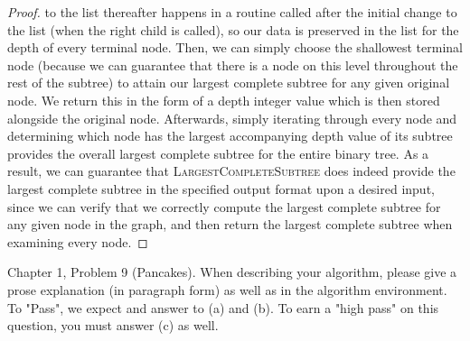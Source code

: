 \documentclass{article}
\begin{document}
\begin{enumerate}
\begin{proof}
		to the list thereafter happens in a routine called after the initial change to the list 
		(when the right child is called), so our data is preserved in the list for the depth of every
		terminal node. Then, we can simply choose the shallowest terminal node (because we can guarantee
		that there is a node on this level throughout the rest of the subtree) to attain our largest
		complete subtree for any given original node. We return this in the form of a depth integer
		value which is then stored alongside the original node. Afterwards, simply iterating through
		every node and determining which node has the largest accompanying depth value of its subtree
		provides the overall largest complete subtree for the entire binary tree. As a result, we can
		guarantee that \textsc{LargestCompleteSubtree} does indeed provide the largest complete subtree
		in the specified output format upon a desired input, since we can verify that we correctly compute
		the largest complete subtree for any given node in the graph, and then return the largest complete
		subtree when examining every node.
	\end{proof}


\end{enumerate}


\nextprob
{}

Chapter 1, Problem 9 (Pancakes). When describing your algorithm, please give a
prose explanation (in paragraph form) as well as in the algorithm environment.
To "Pass", we expect and answer to (a) and (b).  To earn a "high pass" on this
question, you must answer (c) as well.
\end{document}
